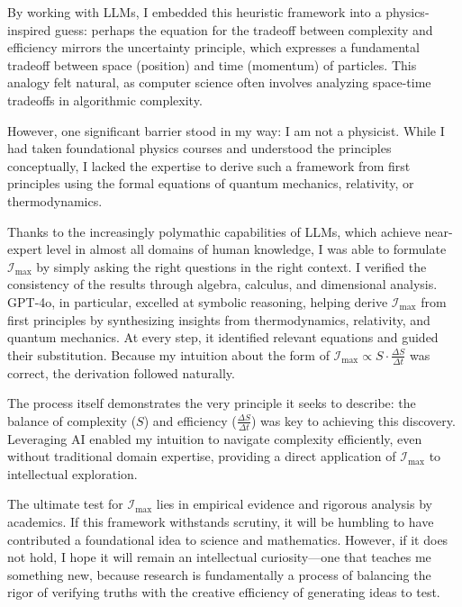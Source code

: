 \documentclass[12pt]{article}
\begin{document}
By working with LLMs, I embedded this heuristic framework into a physics-inspired guess: perhaps the equation for the tradeoff between complexity and efficiency mirrors the uncertainty principle, which expresses a fundamental tradeoff between space (position) and time (momentum) of particles. This analogy felt natural, as computer science often involves analyzing space-time tradeoffs in algorithmic complexity.

However, one significant barrier stood in my way: I am not a physicist. While I had taken foundational physics courses and understood the principles conceptually, I lacked the expertise to derive such a framework from first principles using the formal equations of quantum mechanics, relativity, or thermodynamics.

Thanks to the increasingly polymathic capabilities of LLMs, which achieve near-expert level in almost all domains of human knowledge, I was able to formulate \(\mathcal{I}_{\text{max}}\) by simply asking the right questions in the right context. I verified the consistency of the results through algebra, calculus, and dimensional analysis. GPT-4o, in particular, excelled at symbolic reasoning, helping derive \(\mathcal{I}_{\text{max}}\) from first principles by synthesizing insights from thermodynamics, relativity, and quantum mechanics. At every step, it identified relevant equations and guided their substitution. Because my intuition about the form of \(\mathcal{I}_{\text{max}} \propto S \cdot \frac{\Delta S}{\Delta t}\) was correct, the derivation followed naturally.

The process itself demonstrates the very principle it seeks to describe: the balance of complexity (\(S\)) and efficiency (\(\frac{\Delta S}{\Delta t}\)) was key to achieving this discovery. Leveraging AI enabled my intuition to navigate complexity efficiently, even without traditional domain expertise, providing a direct application of \(\mathcal{I}_{\text{max}}\) to intellectual exploration.

The ultimate test for \(\mathcal{I}_{\text{max}}\) lies in empirical evidence and rigorous analysis by academics. If this framework withstands scrutiny, it will be humbling to have contributed a foundational idea to science and mathematics. However, if it does not hold, I hope it will remain an intellectual curiosity—one that teaches me something new, because research is fundamentally a process of balancing the rigor of verifying truths with the creative efficiency of generating ideas to test.
\end{document}
